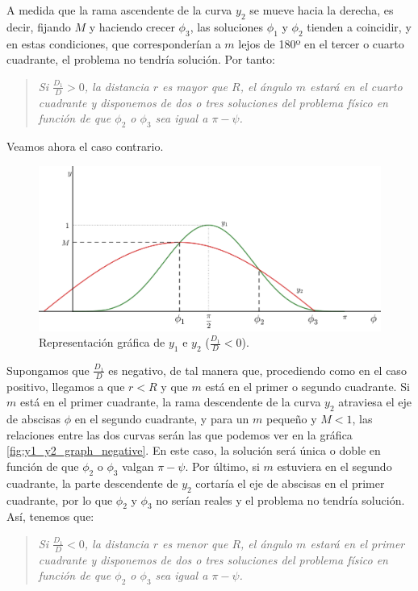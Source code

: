 \documentclass[11pt]{article}
\begin{document}
A medida que la rama ascendente de la curva $y_2$ se mueve hacia la derecha, es decir, fijando $M$ y haciendo crecer $\phi_3$, las soluciones $\phi_1$ y $\phi_2$ tienden a coincidir, y en estas condiciones, que corresponderían a $m$ lejos de 180º en el tercer o cuarto cuadrante, el problema no tendría solución. Por tanto:
\begin{quote}
\textit{Si $\frac{D_1}{D}>0$, la distancia $r$ es mayor que $R$, el ángulo $m$ estará en el cuarto cuadrante y disponemos de dos o tres soluciones del problema físico en función de que $\phi_2$ o $\phi_3$ sea igual a $\pi-\psi$.}\\
\end{quote}

Veamos ahora el caso contrario. 

\begin{figure}[H]
\centering
\includegraphics[scale=0.125]{images/phi_solution_m_positive_M_near_1.png}
\caption{Representación gráfica de $y_1$ e $y_2$ ($\frac{D_1}{D}<0$).}
\label{fig:phi_solution_m_positive_M_near_1}
\end{figure}

Supongamos que $\frac{D_1}{D}$ es negativo, de tal manera que, procediendo como en el caso positivo, llegamos a que $r<R$ y que $m$ está en el primer o segundo cuadrante. Si $m$ está en el primer cuadrante, la rama descendente de la curva $y_2$ atraviesa el eje de abscisas $\phi$ en el segundo cuadrante, y para un $m$ pequeño y $M<1$, las relaciones entre las dos curvas serán las que podemos ver en la gráfica \ref{fig:y1_y2_graph_negative}. En este caso, la solución será única o doble en función de que $\phi_2$ o $\phi_3$ valgan $\pi-\psi$. Por último, si $m$ estuviera en el segundo cuadrante, la parte descendente de $y_2$ cortaría el eje de abscisas en el primer cuadrante, por lo que $\phi_2$ y $\phi_3$ no serían reales y el problema no tendría solución. Así, tenemos que:
\begin{quote}
\textit{Si $\frac{D_1}{D}<0$, la distancia $r$ es menor que $R$, el ángulo $m$ estará en el primer cuadrante y disponemos de dos o tres soluciones del problema físico en función de que $\phi_2$ o $\phi_3$ sea igual a $\pi-\psi$.}\\
\end{quote}
\end{document}
